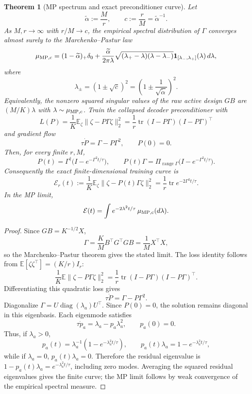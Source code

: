 \documentclass[11pt,a4paper]{article}
\newtheorem{theorem}{Theorem}
\theoremstyle{definition}
\newcommand{\E}{\mathbb E}
\begin{document}
\begin{theorem}[MP spectrum and exact preconditioner curve]
\label{thm:mpcurve}
Let
\[
    \widetilde\alpha:=\frac{M}{r},
    \qquad
    c:=\frac{r}{M}=\widetilde\alpha^{-1}.
\]
As $M,r\to\infty$ with $r/M\to c$, the empirical spectral distribution of
$\Gamma$ converges almost surely to the Marchenko--Pastur law
\[
    \mu_{\rm MP,c}
    =
    (1-\widetilde\alpha)_+\delta_0
    +
    \frac{\widetilde\alpha}{2\pi\lambda}
    \sqrt{(\lambda_+-\lambda)(\lambda-\lambda_-)}
    \mathbf 1_{[\lambda_-,\lambda_+]}(\lambda)\,d\lambda,
\]
where
\[
    \lambda_\pm=(1\pm\sqrt c)^2
    =
    \left(1\pm\frac1{\sqrt{\widetilde\alpha}}\right)^2 .
\]
Equivalently, the nonzero squared singular values of the raw active design
$GB$ are $(M/K)\lambda$ with $\lambda\sim\mu_{\rm MP,c}$.
Train the collapsed decoder preconditioner with
\[
    L(P)=\frac1K\E_\zeta\|\zeta-P\Gamma\zeta\|_2^2
    =
    \frac1r\operatorname{tr}(I-P\Gamma)(I-P\Gamma)^\top
\]
and gradient flow
\[
    \tau\dot P=\Gamma-P\Gamma^2,
    \qquad
    P(0)=0.
\]
Then, for every finite $r,M$,
\[
    P(t)=\Gamma^\dagger\bigl(I-e^{-\Gamma^2t/\tau}\bigr),
    \qquad
    P(t)\Gamma=\Pi_{\operatorname{range}\Gamma}
    \bigl(I-e^{-\Gamma^2t/\tau}\bigr).
\]
Consequently the exact finite-dimensional training curve is
\[
    \mathcal E_r(t)
    :=
    \frac1K\E_\zeta\|\zeta-P(t)\Gamma\zeta\|_2^2
    =
    \frac1r\operatorname{tr}e^{-2\Gamma^2t/\tau}.
\]
In the MP limit,
\[
    \mathcal E(t)
    =
    \int e^{-2\lambda^2t/\tau}\,\mu_{\rm MP,c}(d\lambda).
\]
\end{theorem}

\begin{proof}
Since $GB=K^{-1/2}X$,
\[
    \Gamma=\frac{K}{M}B^\top G^\top GB=\frac1M X^\top X,
\]
so the Marchenko--Pastur theorem gives the stated limit.  The loss identity
follows from $\E[\zeta\zeta^\top]=(K/r)I_r$:
\[
    \frac1K\E\|\zeta-P\Gamma\zeta\|_2^2
    =
    \frac1r\operatorname{tr}(I-P\Gamma)(I-P\Gamma)^\top .
\]
Differentiating this quadratic loss gives
\[
    \tau\dot P=\Gamma-P\Gamma^2.
\]
Diagonalize $\Gamma=U\operatorname{diag}(\lambda_a)U^\top$.  Since $P(0)=0$,
the solution remains diagonal in this eigenbasis.  Each eigenmode satisfies
\[
    \tau\dot p_a=\lambda_a-p_a\lambda_a^2,
    \qquad
    p_a(0)=0.
\]
Thus, if $\lambda_a>0$,
\[
    p_a(t)=\lambda_a^{-1}(1-e^{-\lambda_a^2t/\tau}),
    \qquad
    p_a(t)\lambda_a=1-e^{-\lambda_a^2t/\tau},
\]
while if $\lambda_a=0$, $p_a(t)\lambda_a=0$.  Therefore the residual
eigenvalue is $1-p_a(t)\lambda_a=e^{-\lambda_a^2t/\tau}$, including zero
modes.  Averaging the squared residual eigenvalues gives the finite curve; the
MP limit follows by weak convergence of the empirical spectral measure.
\end{proof}
\end{document}
